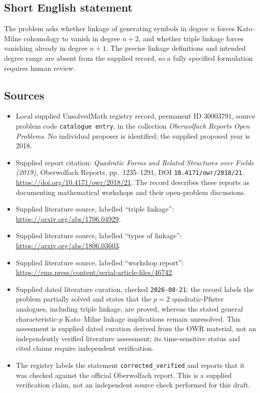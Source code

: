 \documentclass[11pt]{article}
\begin{document}
\subsection{Short English statement}
The problem asks whether linkage of generating symbols in degree \(n\) forces Kato--Milne cohomology to vanish in degree \(n+2\), and whether triple linkage forces vanishing already in degree \(n+1\). The precise linkage definitions and intended degree range are absent from the supplied record, so a fully specified formulation requires human review.
\subsection{Sources}
\begin{itemize}
\item Local supplied UnsolvedMath registry record, permanent ID \(30003791\), source problem code \texttt{catalogue entry}, in the collection \emph{Oberwolfach Reports Open Problems}. No individual proposer is identified; the supplied proposed year is 2018.
\item Supplied report citation: \emph{Quadratic Forms and Related Structures over Fields (2019)}, Oberwolfach Reports, pp.\ 1235--1291, DOI \texttt{10.4171/owr/2018/21}. \url{https://doi.org/10.4171/owr/2018/21}. The record describes these reports as documenting mathematical workshops and their open-problem discussions.
\item Supplied literature source, labelled ``triple linkage'': \url{https://arxiv.org/abs/1706.04929}.
\item Supplied literature source, labelled ``types of linkage'': \url{https://arxiv.org/abs/1806.03603}.
\item Supplied literature source, labelled ``workshop report'': \url{https://ems.press/content/serial-article-files/46742}.
\item Supplied dated literature curation, checked \texttt{2026-08-21}: the record labels the problem partially solved and states that the \(p=2\) quadratic-Pfister analogues, including triple linkage, are proved, whereas the stated general characteristic-\(p\) Kato--Milne linkage implications remain unresolved. This assessment is supplied dated curation derived from the OWR material, not an independently verified literature assessment; its time-sensitive status and cited claims require independent verification.
\item The registry labels the statement \texttt{corrected\_verified} and reports that it was checked against the official Oberwolfach report. This is a supplied verification claim, not an independent source check performed for this draft.
\end{itemize}
\end{document}
